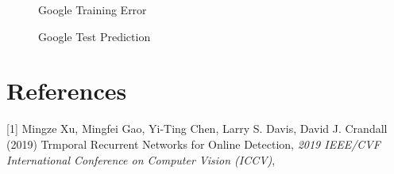 \documentclass{article}
\begin{document}
    \begin{figure}[H]
      \centering
      \begin{minipage}[b]{0.4	\textwidth}
        \caption{Google Training Error}
      \end{minipage}
      \hfill
      \begin{minipage}[b]{0.4	\textwidth}
        \caption{Google Test Prediction}
      \end{minipage}
    \end{figure}








    
\section*{References}

\medskip

\small

[1] Mingze Xu, Mingfei Gao, Yi-Ting Chen, Larry S. Davis, David J. Crandall (2019) Trmporal Recurrent Networks for Online Detection, {\it 2019 IEEE/CVF International Conference on Computer Vision (ICCV)},
\end{document}

